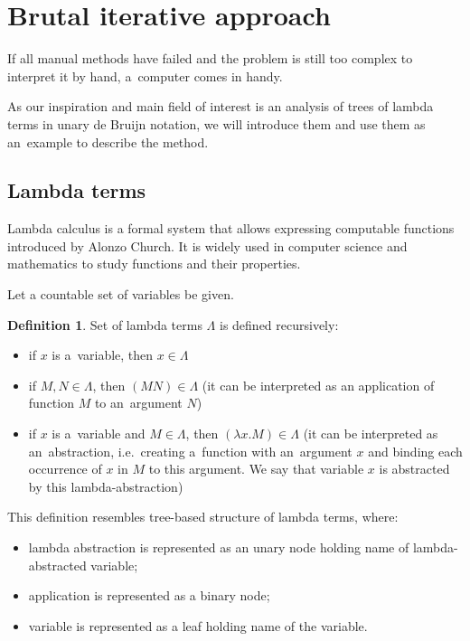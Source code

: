 \documentclass[final]{article}
\theoremstyle{definition}
\newtheorem{definition}{Definition}[subsection]
\theoremstyle{definition}
\theoremstyle{remark}
\begin{document}
\section{Brutal iterative approach}%
\label{sec:brutal_iterative_approach}

If all manual methods have failed and the problem is still too complex to interpret it by hand, a~computer comes in handy.

As our inspiration and main field of interest is an analysis of trees of lambda terms in unary de Bruijn notation, we will introduce them and use them as an~example to describe the method.

\subsection{Lambda terms}%
\label{sub:lambda_terms}

Lambda calculus is a formal system that allows expressing computable functions introduced by Alonzo Church. It is widely used in computer science and mathematics to study functions and their properties.

Let a countable set of variables be given.

\begin{definition}
    Set of lambda terms \(\Lambda\) is defined recursively:
    \begin{itemize}
        \item if \(x\) is a~variable, then \(x \in \Lambda\)
        \item if \(M, N \in \Lambda\), then \((M N) \in \Lambda\) (it can be interpreted as an application of function \(M\) to an~argument \(N\))
        \item if \(x\) is a~variable and \(M \in \Lambda\), then \((\lambda x. M) \in \Lambda\) (it can be interpreted as an~abstraction, i.e.~creating a~function with an~argument \(x\) and binding each occurrence of \(x\) in \(M\) to this argument. We say that variable \(x\) is abstracted by this lambda-abstraction)
    \end{itemize}
\end{definition}

This definition resembles tree-based structure of lambda terms, where:
\begin{itemize}
    \item lambda abstraction is represented as an unary node holding name of lambda-abstracted variable;
    \item application is represented as a binary node;
    \item variable is represented as a leaf holding name of the variable.
\end{itemize}
\end{document}
